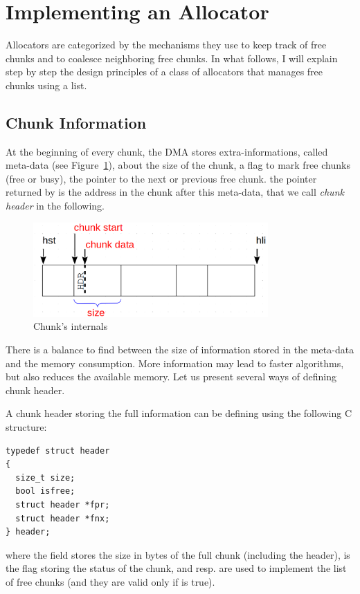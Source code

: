 
\section{Implementing an Allocator}
\label{sec:impl}
Allocators are categorized by the mechanisms they use to keep track of free chunks and to coalesce neighboring free chunks.
In what follows, I will explain step by step the design principles of a class of allocators that manages free chunks using a list.

\subsection{Chunk Information}
At the beginning of every chunk, the DMA stores extra-informations, called meta-data (see Figure~\ref{fig:chunkrep}), about
the size of the chunk, a flag to mark free chunks (free or busy), the pointer to the next or previous free chunk. 
the pointer returned by  is the address in the chunk after this meta-data, that we call \emph{chunk header} in the following.

\begin{figure}[htbp]
    \begin{center}
        \includegraphics[width=0.8\textwidth]{figures/chunk}
    \caption{Chunk's internals}
    \label{fig:chunkrep}
    \end{center}
\end{figure}

There is a balance to find between the size of information stored in the meta-data and the memory consumption.
More information may lead to faster algorithms, but also reduces the available memory.
Let us present several ways of defining chunk header.

A chunk header storing the full information can be defining using the following C structure:
\begin{lstlisting}[style=cstyle]
typedef struct header
{
  size_t size;
  bool isfree;
  struct header *fpr;
  struct header *fnx;
} header;
\end{lstlisting}
where the field  stores the size in bytes of the full chunk (including the header),  is the flag storing the status of the chunk, and  resp.  are used to implement the list of free chunks (and they are valid only if  is true).

